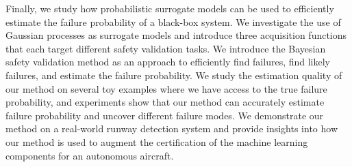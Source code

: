 Finally, we study how probabilistic surrogate models can be used to efficiently estimate the failure probability of a black-box system.
We investigate the use of Gaussian processes as surrogate models and introduce three acquisition functions that each target different safety validation tasks.
We introduce the Bayesian safety validation method as an approach to efficiently find failures, find likely failures, and estimate the failure probability.
We study the estimation quality of our method on several toy examples where we have access to the true failure probability, and experiments show that our method can accurately estimate failure probability and uncover different failure modes.
We demonstrate our method on a real-world runway detection system and provide insights into how our method is used to augment the certification of the machine learning components for an autonomous aircraft.
